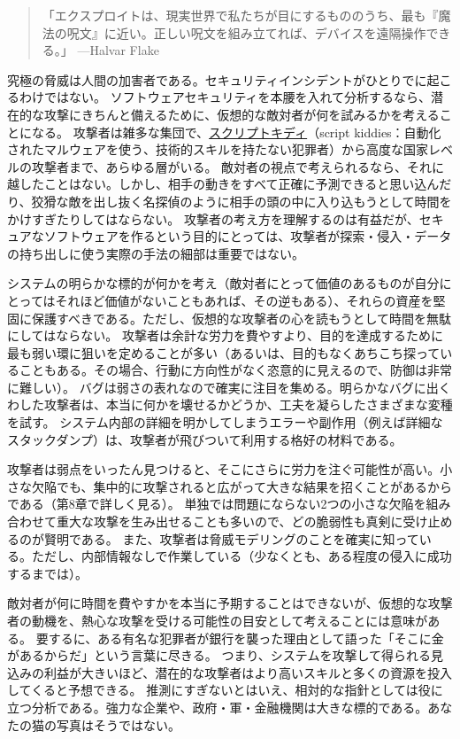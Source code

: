 \documentclass[uplatex]{jsarticle}
\begin{document}
\begin{quote}
「エクスプロイトは、現実世界で私たちが目にするもののうち、最も『魔法の呪文』に近い。正しい呪文を組み立てれば、デバイスを遠隔操作できる。」 ---Halvar Flake
\end{quote}

究極の脅威は人間の加害者である。セキュリティインシデントがひとりでに起こるわけではない。
ソフトウェアセキュリティを本腰を入れて分析するなら、潜在的な攻撃にきちんと備えるために、仮想的な敵対者が何を試みるかを考えることになる。
攻撃者は雑多な集団で、\underline{スクリプトキディ}（script kiddies：自動化されたマルウェアを使う、技術的スキルを持たない犯罪者）から高度な国家レベルの攻撃者まで、あらゆる層がいる。
敵対者の視点で考えられるなら、それに越したことはない。しかし、相手の動きをすべて正確に予測できると思い込んだり、狡猾な敵を出し抜く名探偵のように相手の頭の中に入り込もうとして時間をかけすぎたりしてはならない。
攻撃者の考え方を理解するのは有益だが、セキュアなソフトウェアを作るという目的にとっては、攻撃者が探索・侵入・データの持ち出しに使う実際の手法の細部は重要ではない。

システムの明らかな標的が何かを考え（敵対者にとって価値のあるものが自分にとってはそれほど価値がないこともあれば、その逆もある）、それらの資産を堅固に保護すべきである。ただし、仮想的な攻撃者の心を読もうとして時間を無駄にしてはならない。
攻撃者は余計な労力を費やすより、目的を達成するために最も弱い環に狙いを定めることが多い（あるいは、目的もなくあちこち探っていることもある。その場合、行動に方向性がなく恣意的に見えるので、防御は非常に難しい）。
バグは弱さの表れなので確実に注目を集める。明らかなバグに出くわした攻撃者は、本当に何かを壊せるかどうか、工夫を凝らしたさまざまな変種を試す。
システム内部の詳細を明かしてしまうエラーや副作用（例えば詳細なスタックダンプ）は、攻撃者が飛びついて利用する格好の材料である。

攻撃者は弱点をいったん見つけると、そこにさらに労力を注ぐ可能性が高い。小さな欠陥でも、集中的に攻撃されると広がって大きな結果を招くことがあるからである（第8章で詳しく見る）。
単独では問題にならない2つの小さな欠陥を組み合わせて重大な攻撃を生み出せることも多いので、どの脆弱性も真剣に受け止めるのが賢明である。
また、攻撃者は脅威モデリングのことを確実に知っている。ただし、内部情報なしで作業している（少なくとも、ある程度の侵入に成功するまでは）。

敵対者が何に時間を費やすかを本当に予期することはできないが、仮想的な攻撃者の動機を、熱心な攻撃を受ける可能性の目安として考えることには意味がある。
要するに、ある有名な犯罪者が銀行を襲った理由として語った「そこに金があるからだ」という言葉に尽きる。
つまり、システムを攻撃して得られる見込みの利益が大きいほど、潜在的な攻撃者はより高いスキルと多くの資源を投入してくると予想できる。
推測にすぎないとはいえ、相対的な指針としては役に立つ分析である。強力な企業や、政府・軍・金融機関は大きな標的である。あなたの猫の写真はそうではない。
\end{document}
